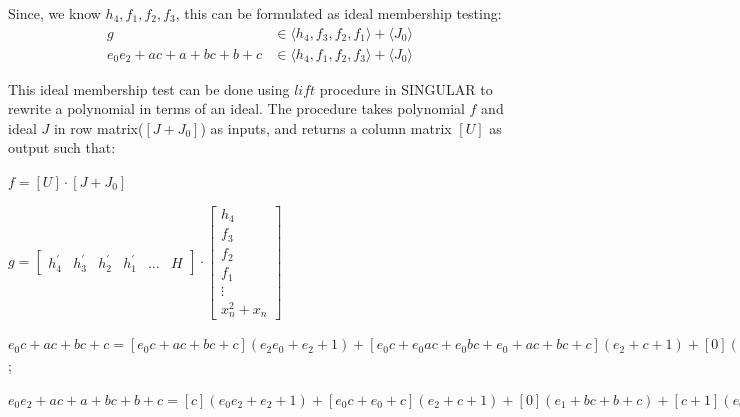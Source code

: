 \begin{Example}
Since, we know $h_4,f_1,f_2,f_3$, this can be formulated as ideal membership testing:
\begin{equation*}
\begin{split}
g &\in \langle h_4,f_3,f_2,f_1\rangle + \langle J_0\rangle\\
e_0e_2+ac+a+bc+b+c &\in \langle h_4,f_1,f_2,f_3\rangle + \langle J_0\rangle
\end{split}
\end{equation*}

This ideal membership test can be done using $lift$ procedure in SINGULAR to rewrite a polynomial in terms of an ideal. The procedure takes polynomial $f$ and ideal $J$ in row matrix($[J+J_0]$) as inputs, and returns a column matrix $[U]$ as output such that:
\begin{small}
$f = [U]\cdot [J+J_0]$
\end{small}

\begin{small}
$g = \begin{bmatrix} h_4^{'} & h_3^{'} & h_2^{'} & h_1^{'} & \dots & H \end{bmatrix} \cdot 
    \begin{bmatrix} h_4 \\ f_3 \\ f_2 \\ f_1 \\ \vdots \\ x_n^2 + x_n \end{bmatrix}$
\end{small}

\begin{small}
$e_0c+ac+bc+c = [e_0c+ac+bc+c](e_2e_0+e_2+1) + [e_0c+e_0ac+e_0bc+e_0+ac+bc+c](e_2+c+1) + [0](e_1+bc+b+c) + [e_0c+e_0ac+e_0bc+e_0+ac+bc+c](e_0+a+b) + \dots + [0](x_n^2 + x_n)$;
\end{small}

$e_0e_2+ac+a+bc+b+c = [c](e_0e_2+e_2+1) + [e_0c+e_0+c](e_2 + c + 1) + [0](e_1 + bc + b + c) + [c+1](e_0 + a + b);$
\end{Example}

